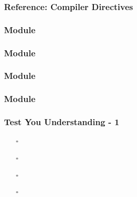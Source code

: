 \documentclass[t, notes, xcolor=table]{beamer}
\begin{document}
\begin{frame}
\frametitle{Reference: Compiler Directives}

\end{frame}
\note{

}

\begin{frame}
\frametitle{Module}

\end{frame}
\note{

}

\begin{frame}
\frametitle{Module}

\end{frame}
\note{

}

\begin{frame}
\frametitle{Module}

\end{frame}
\note{

}

\begin{frame}
\frametitle{Module}

\end{frame}
\note{

}

\begin{frame}
\frametitle{Test You Understanding - 1}

\begin{itemize}
\item[$\square$] 
\item[$\square$] 
\item[$\square$] 
\item[$\square$] 
\end{itemize}
\end{frame}
\note{

}
\end{document}
